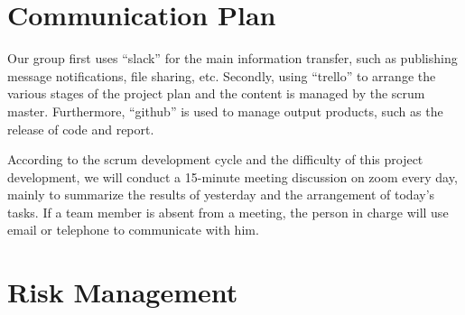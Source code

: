 \documentclass{report}
\begin{document}
\section{Communication Plan}
Our group first uses “slack” for the main information transfer, such as publishing message notifications, file sharing, etc. Secondly, using “trello” to arrange the various stages of the project plan and the content is managed by the scrum master. Furthermore, “github” is used to manage output products, such as the release of code and report.

According to the scrum development cycle and the difficulty of this project development, we will conduct a 15-minute meeting discussion on zoom every day, mainly to summarize the results of yesterday and the arrangement of today's tasks. If a team member is absent from a meeting, the person in charge will use email or telephone to communicate with him.

\section{Risk Management}
\end{document}
